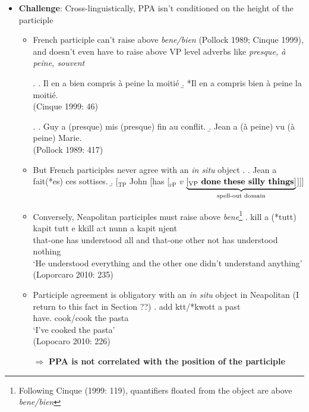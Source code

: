 \documentclass[letterpaper,10pt]{handout_nick}
\begin{document}
\begin{itemize}
\item {\bf Challenge}: Cross-linguistically, PPA isn't conditioned on the height of the participle 
\begin{itemize}
\item French participle can't raise above \emph{bene/bien} (Pollock 1989; Cinque 1999), and doesn't even have to raise above VP level adverbs like \emph{presque, \`a peine, souvent}
\begin{multicols}{2}
\ex. \a. Il en a bien compris \`a peine la moiti\'e
\b. *Il en a compris bien \`a peine la moiti\'e.\\
(Cinque 1999: 46)

\ex. \a. Guy a (presque) mis (presque) fin au conflit.
\b. Jean a (\`a peine) vu (\`a peine) Marie.\\
(Pollock 1989: 417)

\end{multicols}
\item But French participles never agree with an \emph{in situ} object
\ex. \a. Jean a fait(*es) ces sottises.
\b. [$_\text{TP}$ John [has [$_\text{$v$P}$ $v$ $\underbrace{\text{[$_\text{VP}$ {\bf done} {\bf these silly things}]}}_\text{spell-out domain}$]]]

\item Conversely, Neapolitan participles must raise above \emph{bene}\footnote{Following Cinque (1999: 119), quantifiers floated from the object are above \emph{bene/bien}
}
\exg. kill a (*tutt\textschwa) {kapit\textschwa} tutt e kkill {a:t\textschwa} nunn a {kapit\textschwa} njent\textschwa\\
that-one has { } understood all and that-one other not has understood nothing\\ 
`He understood everything and the other one didn't understand anything'\\
(Loporcaro 2010: 235)

\item Participle agreement is obligatory with an \emph{in situ} object in Neapolitan (I return to this fact in Section ??)
\exg. {add\textyogh\textschwa} {k\textopeno tt\textschwa}/*{kwott\textschwa} a {past\textschwa}\\
have. cook/cook the pasta\\
`I've cooked the pasta'\\
(Lopocaro 2010: 226)

\item[$\Rightarrow$] {\bf PPA is not correlated with the position of the participle}
\end{itemize}
\end{itemize}
\end{document}
